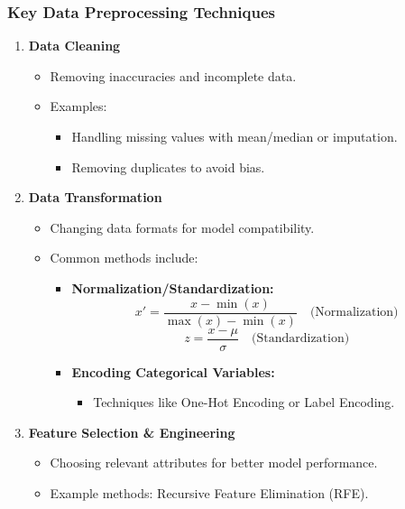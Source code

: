 \documentclass[aspectratio=169]{beamer}
\begin{document}
\begin{frame}[fragile]
    \frametitle{Key Data Preprocessing Techniques}
    \begin{enumerate}
        \item \textbf{Data Cleaning}
            \begin{itemize}
                \item Removing inaccuracies and incomplete data.
                \item Examples:
                    \begin{itemize}
                        \item Handling missing values with mean/median or imputation.
                        \item Removing duplicates to avoid bias.
                    \end{itemize}
            \end{itemize}
        \item \textbf{Data Transformation}
            \begin{itemize}
                \item Changing data formats for model compatibility.
                \item Common methods include:
                    \begin{itemize}
                        \item \textbf{Normalization/Standardization:}
                            \begin{equation}
                                x' = \frac{x - \min(x)}{\max(x) - \min(x)} \quad \text{(Normalization)}
                            \end{equation}
                            \begin{equation}
                                z = \frac{x - \mu}{\sigma} \quad \text{(Standardization)}
                            \end{equation}
                        \item \textbf{Encoding Categorical Variables:}
                            \begin{itemize}
                                \item Techniques like One-Hot Encoding or Label Encoding.
                            \end{itemize}
                    \end{itemize}
            \end{itemize}
        \item \textbf{Feature Selection \& Engineering}
            \begin{itemize}
                \item Choosing relevant attributes for better model performance.
                \item Example methods: Recursive Feature Elimination (RFE).
            \end{itemize}
    \end{enumerate}
\end{frame}
\end{document}
